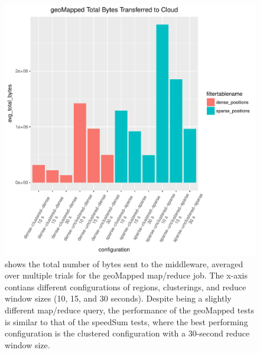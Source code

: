 \documentclass{thesis}
\begin{document}
    \begin{figure}
        \centering
        \includegraphics[scale=.8]{binImages/geoMapped-runplot.pdf}
        \caption{shows the total number of bytes sent to the middleware,
        averaged over multiple trials for the geoMapped map/reduce job. The x-axis contians different
        configurations of regions, clusterings, and reduce window sizes (10, 15, and 30 seconds).
        Despite being a slightly different map/reduce query, the performance of the geoMapped tests
        is similar to that of the speedSum tests, where the best performing configuration is the clustered
        configuration with a 30-second reduce window size.}
    \end{figure}
\end{document}
